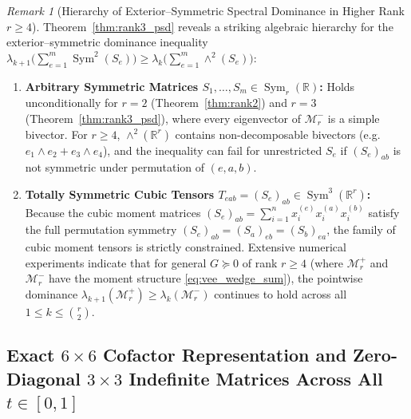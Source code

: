 \documentclass[11pt,a4paper]{article}
\theoremstyle{plain}
\theoremstyle{definition}
\theoremstyle{remark}
\newtheorem{remark}[theorem]{Remark}
\DeclareMathOperator{\Sym}{Sym}
\begin{document}
\begin{remark}[Hierarchy of Exterior--Symmetric Spectral Dominance in Higher Rank $r \ge 4$]\label{rem:hierarchy}
Theorem~\ref{thm:rank3_psd} reveals a striking algebraic hierarchy for the exterior--symmetric dominance inequality $\lambda_{k+1}\!\big(\sum_{e=1}^m \Sym^2(S_e)\big) \ge \lambda_k\!\big(\sum_{e=1}^m \wedge^2(S_e)\big)$:
\begin{enumerate}[label=(\roman*),nosep]
  \item \textbf{Arbitrary Symmetric Matrices $S_1,\dots,S_m \in \Sym_r(\mathbb{R})$:} Holds unconditionally for $r = 2$ (Theorem~\ref{thm:rank2}) and $r = 3$ (Theorem~\ref{thm:rank3_psd}), where every eigenvector of $\mathcal{M}_r^-$ is a simple bivector. For $r \ge 4$, $\wedge^2(\mathbb{R}^r)$ contains non-decomposable bivectors (e.g.\ $e_1 \wedge e_2 + e_3 \wedge e_4$), and the inequality can fail for unrestricted $S_e$ if $(S_e)_{ab}$ is not symmetric under permutation of $(e,a,b)$.
  \item \textbf{Totally Symmetric Cubic Tensors $T_{eab} = (S_e)_{ab} \in \Sym^3(\mathbb{R}^r)$:} Because the cubic moment matrices $(S_e)_{ab} = \sum_{i=1}^n x_i^{(e)} x_i^{(a)} x_i^{(b)}$ satisfy the full permutation symmetry $(S_e)_{ab} = (S_a)_{eb} = (S_b)_{ea}$, the family of cubic moment tensors is strictly constrained. Extensive numerical experiments indicate that for general $G \succeq 0$ of rank $r \ge 4$ (where $\mathcal{M}_r^+$ and $\mathcal{M}_r^-$ have the moment structure \eqref{eq:vee_wedge_sum}), the pointwise dominance $\lambda_{k+1}(\mathcal{M}_r^+) \ge \lambda_k(\mathcal{M}_r^-)$ continues to hold across all $1 \le k \le \binom{r}{2}$.
\end{enumerate}
\end{remark}

\subsection{Exact \texorpdfstring{$6 \times 6$}{6x6} Cofactor Representation and Zero-Diagonal \texorpdfstring{$3 \times 3$}{3x3} Indefinite Matrices Across All \texorpdfstring{$t \in [0,1]$}{t in [0,1]}}
\end{document}
